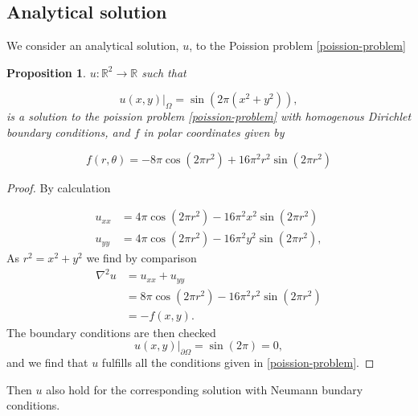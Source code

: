 \documentclass[a4paper,english]{elsarticle}%
\newcommand{\restr}[2]{\ensuremath{\left.#1\right|_{#2}}}
\newtheorem{proposition}[theorem]{Proposition}
\begin{document}
\subsection{Analytical solution}
We consider an analytical solution, $u$, to the Poission problem \eqref{poission-problem}
\begin{proposition}\label{prop-analytical-solution}
    $u: \mathbb{R}^2 \rightarrow \mathbb{R}$ such that

    \begin{equation}
    \restr{u(x,y)}{\Omega} = \sin(2\pi (x^2 + y^2)),
    \label{analytical-solution}
    \end{equation}
    is a solution to the poission problem \eqref{poission-problem} with homogenous Dirichlet boundary conditions, and  $f$ in polar coordinates given by

    \begin{equation}
    f(r,\theta) = -8\pi\cos(2\pi r^2) + 16 \pi^2r^2 \sin(2\pi r^2)
    \label{f-analytic}
    \end{equation}
\end{proposition}
\begin{proof}
By calculation

\begin{equation*}
\begin{aligned}
 u_{xx} &= 4\pi\cos(2\pi r^2) - 16\pi^2x^2\sin(2\pi r^2)
\\
u_{yy} &= 4\pi\cos(2\pi r^2) - 16\pi^2y^2\sin(2\pi r^2),
\end{aligned}
\end{equation*}
As $r^2 = x^2 + y^2$ we find by comparison
\begin{equation*}
\begin{aligned}
\nabla^2 u &= u_{xx} + u_{yy}\\
&= 8\pi \cos(2\pi r^2) - 16\pi^2r^2\sin(2\pi r^2)\\
& = -f(x,y).
\end{aligned}
\end{equation*}
The boundary conditions are then checked
\begin{equation*}
    \restr{u(x,y)}{\partial\Omega} = \sin(2\pi) = 0,
\end{equation*}
and we find that $u$ fulfills all the conditions given in \eqref{poission-problem}. 
\end{proof}
\noindent Then $u$ also hold for the corresponding solution with Neumann bundary conditions. 
\end{document}
